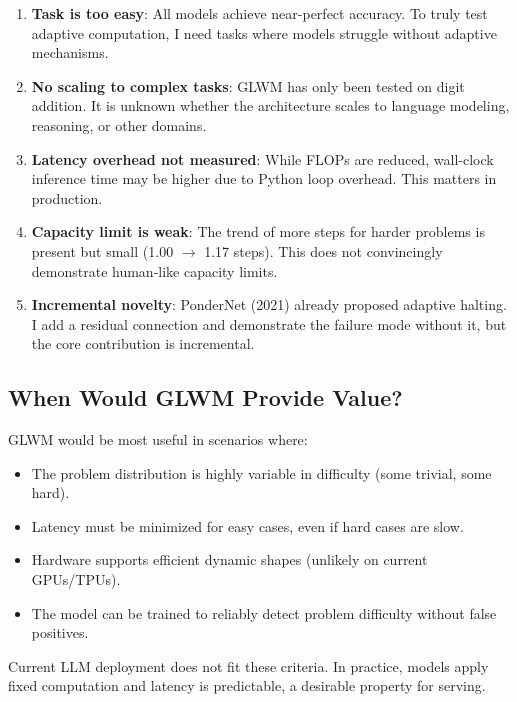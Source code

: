 \documentclass[11pt]{article}
\begin{document}
\begin{enumerate}
    \item \textbf{Task is too easy}: All models achieve near-perfect accuracy. To truly test adaptive computation, I need tasks where models struggle without adaptive mechanisms.
    
    \item \textbf{No scaling to complex tasks}: GLWM has only been tested on digit addition. It is unknown whether the architecture scales to language modeling, reasoning, or other domains.
    
    \item \textbf{Latency overhead not measured}: While FLOPs are reduced, wall-clock inference time may be higher due to Python loop overhead. This matters in production.
    
    \item \textbf{Capacity limit is weak}: The trend of more steps for harder problems is present but small (1.00 $\to$ 1.17 steps). This does not convincingly demonstrate human-like capacity limits.
    
    \item \textbf{Incremental novelty}: PonderNet (2021) already proposed adaptive halting. I add a residual connection and demonstrate the failure mode without it, but the core contribution is incremental.
\end{enumerate}

\subsection{When Would GLWM Provide Value?}

GLWM would be most useful in scenarios where:

\begin{itemize}
    \item The problem distribution is highly variable in difficulty (some trivial, some hard).
    \item Latency must be minimized for easy cases, even if hard cases are slow.
    \item Hardware supports efficient dynamic shapes (unlikely on current GPUs/TPUs).
    \item The model can be trained to reliably detect problem difficulty without false positives.
\end{itemize}

Current LLM deployment does not fit these criteria. In practice, models apply fixed computation and latency is predictable, a desirable property for serving.
\end{document}
